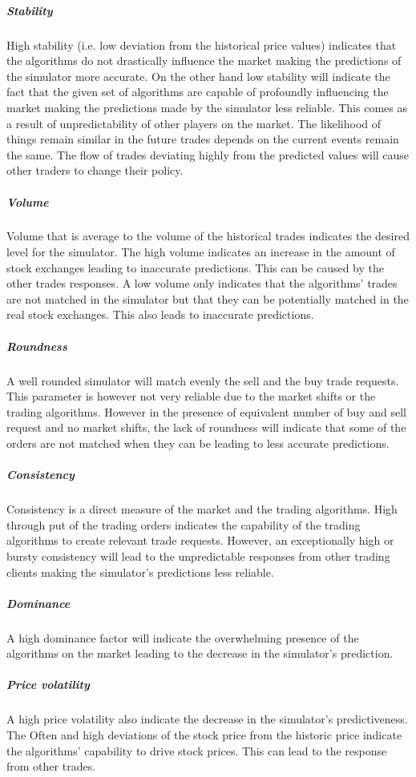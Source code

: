 \documentclass{article}
\begin{document}
\subparagraph{Stability} High stability (i.e. low deviation from the historical price values) indicates that the algorithms do not drastically influence the market making the predictions of the simulator more accurate. On the other hand low stability will indicate the fact that the given set of algorithms are capable of profoundly influencing the market making the predictions made by the simulator less reliable. This comes as a result of unpredictability of other players on the market. The likelihood of things remain similar in the future trades depends on the current events remain the same. The flow of trades deviating highly from the predicted values will cause other traders to change their policy. 

\subparagraph{Volume} Volume that is average to the volume of the historical trades indicates the desired level for the simulator. The high volume indicates an increase in the amount of stock exchanges leading to inaccurate predictions. This can be caused by the other trades responses. A low volume only indicates that the algorithms' trades are not matched in the simulator but that they can be potentially matched in the real stock exchanges. This also leads to inaccurate predictions. 

\subparagraph{Roundness} A well rounded simulator will match evenly the sell and the buy trade requests. This parameter is however not very reliable due to the market shifts or the trading algorithms. However in the presence of equivalent number of buy and sell request and no market shifts, the lack of roundness will indicate that some of the orders are not matched when they can be leading to less accurate predictions.

\subparagraph{Consistency} Consistency is a direct measure of the market and the trading algorithms. High through put of the trading orders indicates the capability of the trading algorithms to create relevant trade requests. However, an exceptionally high or bursty consistency will lead to the unpredictable responses from other trading clients making the simulator's predictions less reliable. 

\subparagraph{Dominance} A high dominance factor will indicate the overwhelming presence of the algorithms on the market leading to the decrease in the simulator's prediction.

\subparagraph{Price volatility} A high price volatility also indicate the decrease in the simulator's predictiveness. The Often and high deviations of the stock price from the historic price indicate the algorithms' capability to drive stock prices. This can lead to the response from other trades.
\end{document}
